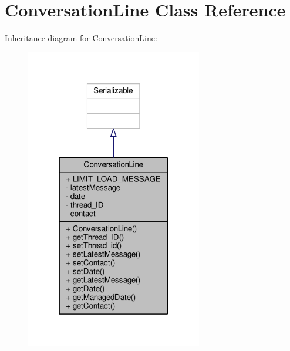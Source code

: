 \hypertarget{a00008}{\section{Conversation\+Line Class Reference}
\label{a00008}
}


Inheritance diagram for Conversation\+Line\+:
\nopagebreak
\begin{figure}[H]
\begin{center}
\leavevmode
\includegraphics[width=218pt]{a00068}
\end{center}
\end{figure}


